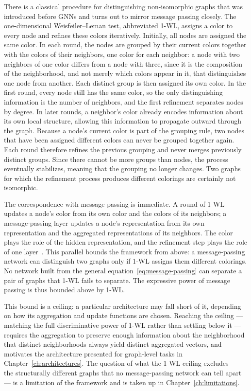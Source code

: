 There is a classical procedure for distinguishing non-isomorphic graphs that
was introduced before GNNs and turns out to mirror message passing closely.
The one-dimensional Weisfeiler--Leman test, abbreviated \mbox{1-WL}, assigns a
color to every node and refines these colors iteratively. Initially, all nodes are assigned
the same color. In each round, the nodes are grouped by their current colors together
with the colors of their neighbors, one color for each neighbor: a node with two neighbors
of one color differs from a node with three, since it is the composition of the neighborhood,
and not merely which colors appear in it, that distinguishes one node from another.
Each distinct group is then assigned its own color. In the first round, every node
still has the same color, so the only distinguishing information is the number
of neighbors, and the first refinement separates nodes by degree. In later
rounds, a neighbor's color already encodes information about its own local
structure, allowing this information to propagate outward through the graph.
Because a node's current color is part of the grouping rule, two nodes that have
been assigned different colors can never be grouped together again. Each round
therefore refines the previous grouping and never merges previously distinct
groups. Since there cannot be more groups than nodes, the process eventually
stabilizes, meaning that the grouping no longer changes. Two graphs for which the
refinement process produces different colorings are certainly not isomorphic.
 
\newpage

The correspondence with message passing is immediate. A round of
\mbox{1-WL} updates a node's color from its own color and the colors of its
neighbors; a message-passing layer updates a node's representation from
its own representation and the aggregated representations of its neighbors. The
color plays the role of the hidden representation, and the refinement step plays
the role of one layer~\cite{xu2019}. This parallel bounds the
framework from above: a message-passing network can distinguish two graphs only
if \mbox{1-WL} assigns them different colorings. No network built from the
general equation~\eqref{eq:message-passing} can separate a pair of graphs that
\mbox{1-WL} fails to separate. The expressive power of message passing is thus bounded 
above by \mbox{1-WL}.
 
This bound is a ceiling: a particular architecture may fall short
of it, depending on how its aggregation and update functions are chosen.
Reaching the ceiling --- matching the full discriminative power of \mbox{1-WL}
rather than settling below it --- requires the aggregation to preserve enough
information about the neighborhood that distinct neighborhoods always yield
distinct aggregated vectors, and motivates the architecture presented
for graph-level tasks in Chapter~\ref{ch:architectures}. The question of what the
\mbox{1-WL} ceiling excludes --- the structurally different graphs that no
message-passing network can tell apart --- is a limitation of the framework and
is taken up in Chapter~\ref{ch:limitations}.
 
